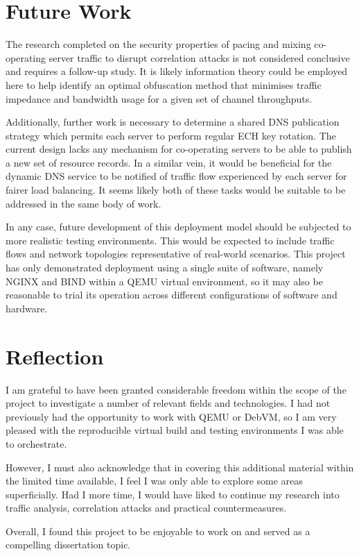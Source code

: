 \section{Future Work}

The research completed on the security properties of pacing and mixing co-operating server traffic to disrupt correlation attacks is not considered conclusive and requires a follow-up study. It is likely information theory could be employed here to help identify an optimal obfuscation method that minimises traffic impedance and bandwidth usage for a given set of channel throughputs.

Additionally, further work is necessary to determine a shared DNS publication strategy which permits each server to perform regular ECH key rotation. The current design lacks any mechanism for co-operating servers to be able to publish a new set of resource records. In a similar vein, it would be beneficial for the dynamic DNS service to be notified of traffic flow experienced by each server for fairer load balancing. It seems likely both of these tasks would be suitable to be addressed in the same body of work.

In any case, future development of this deployment model should be subjected to more realistic testing environments. This would be expected to include traffic flows and network topologies representative of real-world scenarios. This project has only demonstrated deployment using a single suite of software, namely NGINX and BIND within a QEMU virtual environment, so it may also be reasonable to trial its operation across different configurations of software and hardware.








\section{Reflection}

I am grateful to have been granted considerable freedom within the scope of the project to investigate a number of relevant fields and technologies. I had not previously had the opportunity to work with QEMU or DebVM, so I am very pleased with the reproducible virtual build and testing environments I was able to orchestrate.

However, I must also acknowledge that in covering this additional material within the limited time available, I feel I was only able to explore some areas superficially. Had I more time, I would have liked to continue my research into traffic analysis, correlation attacks and practical countermeasures.

Overall, I found this project to be enjoyable to work on and served as a compelling dissertation topic.
